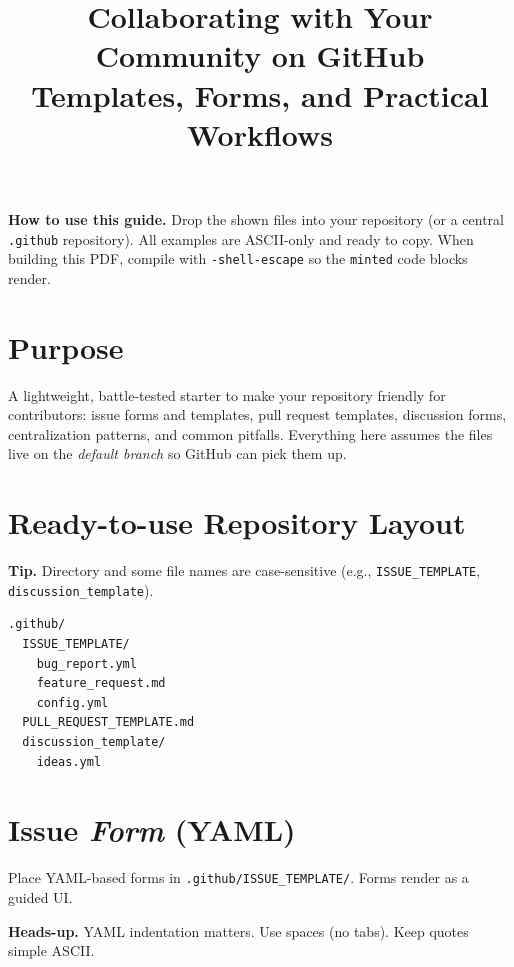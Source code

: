 \documentclass[11pt]{article}
\title{\textbf{Collaborating with Your Community on GitHub}\\
\large Templates, Forms, and Practical Workflows}
\author{}
\date{}
\begin{document}
\maketitle
\vspace{-0.75em}
\begin{tcolorbox}
\textbf{How to use this guide.}
Drop the shown files into your repository (or a central \texttt{.github} repository).
All examples are ASCII-only and ready to copy.
When building this PDF, compile with \texttt{-shell-escape} so the \texttt{minted} code blocks render.
\end{tcolorbox}

\tableofcontents
\clearpage

\section{Purpose}
A lightweight, battle-tested starter to make your repository friendly for contributors:
issue forms and templates, pull request templates, discussion forms, centralization patterns, and common pitfalls.
Everything here assumes the files live on the \emph{default branch} so GitHub can pick them up.

\section{Ready-to-use Repository Layout}
\begin{tcolorbox}
\textbf{Tip.} Directory and some file names are case-sensitive (e.g., \texttt{ISSUE\_TEMPLATE}, \texttt{discussion\_template}).
\end{tcolorbox}

\begin{verbatim}
.github/
  ISSUE_TEMPLATE/
    bug_report.yml
    feature_request.md
    config.yml
  PULL_REQUEST_TEMPLATE.md
  discussion_template/
    ideas.yml
\end{verbatim}
\clearpage

\section{Issue \emph{Form} (YAML)}
Place YAML-based forms in \texttt{.github/ISSUE\_TEMPLATE/}. Forms render as a guided UI.
\begin{tcolorbox}
\textbf{Heads-up.} YAML indentation matters. Use spaces (no tabs). Keep quotes simple ASCII.
\end{tcolorbox}
\end{document}
